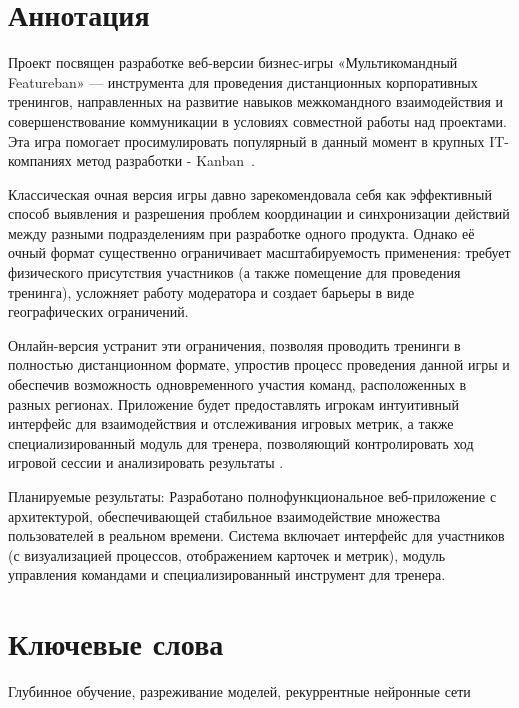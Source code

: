 \documentclass[a4paper,12pt]{extarticle}
\begin{document}
\newpage
\setcounter{page}{2}

{
	\hypersetup{linkcolor=black}
	\tableofcontents
}

\newpage

\newpage
\section*{Аннотация}   %
Проект посвящен разработке веб-версии бизнес-игры «Мультикомандный Featureban» — инструмента для проведения дистанционных корпоративных тренингов, направленных на развитие навыков межкомандного взаимодействия и совершенствование коммуникации в условиях совместной работы над проектами.
Эта игра помогает просимулировать популярный в данный момент в крупных IT-компаниях метод разработки - Kanban~\cite{kanban-book-bor}.

Классическая очная версия игры давно зарекомендовала себя как эффективный способ выявления и разрешения проблем координации и синхронизации действий между разными подразделениям при разработке одного продукта. Однако её очный формат существенно ограничивает масштабируемость применения: требует физического присутствия участников (а также помещение для проведения тренинга), усложняет работу модератора и создает барьеры в виде географических ограничений.

Онлайн-версия устранит эти ограничения, позволяя проводить тренинги в полностью дистанционном формате, упростив процесс проведения данной игры и обеспечив возможность одновременного участия команд, расположенных в разных регионах. Приложение будет предоставлять игрокам интуитивный интерфейс для взаимодействия и отслеживания игровых метрик, а также специализированный модуль для тренера, позволяющий контролировать ход игровой сессии и анализировать результаты .

Планируемые результаты: Разработано полнофункциональное веб-приложение с архитектурой, обеспечивающей стабильное взаимодействие множества пользователей в реальном времени. Система включает интерфейс для участников (с визуализацией процессов, отображением карточек и метрик), модуль управления командами и специализированный инструмент для тренера. 


\section*{Ключевые слова}
Глубинное обучение, разреживание моделей, рекуррентные нейронные сети
\pagebreak
\end{document}
